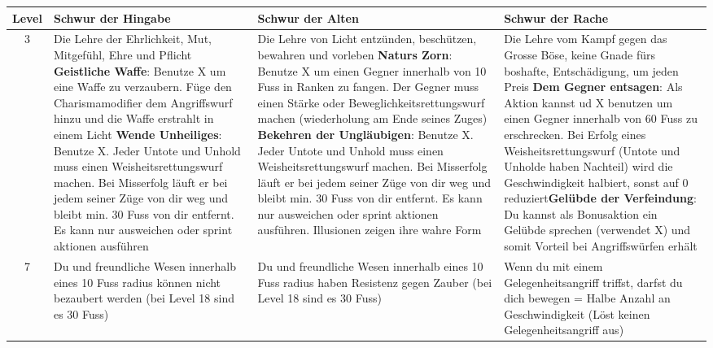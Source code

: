 \begin{table}
	\centering
	\begin{tabular}{cp{6cm}p{6cm}p{6cm}}
	\textbf{Level} & \textbf{Schwur der Hingabe} & \textbf{Schwur der Alten} & \textbf{Schwur der Rache}\\ \hline

	3 &
	Die Lehre der Ehrlichkeit, Mut, Mitgefühl, Ehre und Pflicht\linebreak\linebreak
	\textbf{Geistliche Waffe}: Benutze X um eine Waffe zu verzaubern. Füge den Charismamodifier dem Angriffswurf hinzu und die Waffe erstrahlt in einem Licht\linebreak
	\textbf{Wende Unheiliges}: Benutze X. Jeder Untote und Unhold muss einen Weisheitsrettungswurf machen. Bei Misserfolg läuft er bei jedem seiner Züge von dir weg und bleibt min. 30 Fuss von dir entfernt. Es kann nur ausweichen oder sprint aktionen ausführen&
	Die Lehre von Licht entzünden, beschützen, bewahren und vorleben\linebreak\linebreak
	\textbf{Naturs Zorn}: Benutze X um einen Gegner innerhalb von 10 Fuss in Ranken zu fangen. Der Gegner muss einen Stärke oder Beweglichkeitsrettungswurf machen (wiederholung am Ende seines Zuges)\linebreak
	\textbf{Bekehren der Ungläubigen}: Benutze X. Jeder Untote und Unhold muss einen Weisheitsrettungswurf machen. Bei Misserfolg läuft er bei jedem seiner Züge von dir weg und bleibt min. 30 Fuss von dir entfernt. Es kann nur ausweichen oder sprint aktionen ausführen. Illusionen zeigen ihre wahre Form&
	Die Lehre vom Kampf gegen das Grosse Böse, keine Gnade fürs boshafte, Entschädigung, um jeden Preis\linebreak\linebreak
	\textbf{Dem Gegner entsagen}: Als Aktion kannst ud X benutzen um einen Gegner innerhalb von 60 Fuss zu erschrecken. Bei Erfolg eines Weisheitsrettungswurf (Untote und Unholde haben Nachteil) wird die Geschwindigkeit halbiert, sonst auf 0 reduziert\linebreak\textbf{Gelübde der Verfeindung}: Du kannst als Bonusaktion ein Gelübde sprechen (verwendet X) und somit Vorteil bei Angriffswürfen erhält\\ \hline

	7 &
	Du und freundliche Wesen innerhalb eines 10 Fuss radius können nicht bezaubert werden (bei Level 18 sind es 30 Fuss)&
	Du und freundliche Wesen innerhalb eines 10 Fuss radius haben Resistenz gegen Zauber (bei Level 18 sind es 30 Fuss)&
	Wenn du mit einem Gelegenheitsangriff triffst, darfst du dich bewegen = Halbe Anzahl an Geschwindigkeit (Löst keinen Gelegenheitsangriff aus)\\ \hline
	

\end{tabular}
\end{table}
